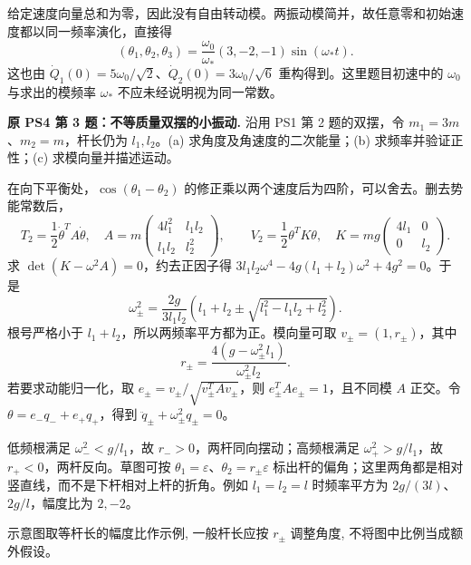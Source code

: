 \begin{solution}
给定速度向量总和为零，因此没有自由转动模。两振动模简并，故任意零和初始速度都以同一频率演化，直接得
\[
 (\theta_1,\theta_2,\theta_3)
 =\frac{\omega_0}{\omega_*}(3,-2,-1)\sin(\omega_*t).
\]
这也由 $\dot Q_1(0)=5\omega_0/\sqrt2$、$\dot Q_2(0)=3\omega_0/\sqrt6$ 重构得到。这里题目初速中的 $\omega_0$ 与求出的模频率 $\omega_*$ 不应未经说明视为同一常数。
\end{solution}

\begin{example}
\textbf{原 PS4 第 3 题：不等质量双摆的小振动.} 
沿用 PS1 第 2 题的双摆，令 $m_1=3m$、$m_2=m$，杆长仍为 $l_1,l_2$。(a) 求角度及角速度的二次能量；(b) 求频率并验证正性；(c) 求模向量并描述运动。
\end{example}
\begin{solution}
在向下平衡处，$\cos(\theta_1-\theta_2)$ 的修正乘以两个速度后为四阶，可以舍去。删去势能常数后，
\[
 T_2=\frac12\dot\theta^TA\dot\theta,\quad
 A=m\begin{pmatrix}4l_1^2&l_1l_2\\l_1l_2&l_2^2\end{pmatrix},\qquad
 V_2=\frac12\theta^TK\theta,\quad
 K=mg\begin{pmatrix}4l_1&0\\0&l_2\end{pmatrix}.
\]
求 $\det(K-\omega^2A)=0$，约去正因子得 $3l_1l_2\omega^4-4g(l_1+l_2)\omega^2+4g^2=0$。于是
\[
 \omega_\pm^2=\frac{2g}{3l_1l_2}
 \left(l_1+l_2\pm\sqrt{l_1^2-l_1l_2+l_2^2}\right).
\]
根号严格小于 $l_1+l_2$，所以两频率平方都为正。模向量可取 $v_\pm=(1,r_\pm)$，其中
\[
 r_\pm=\frac{4(g-\omega_\pm^2l_1)}{\omega_\pm^2l_2}.
\]
若要求动能归一化，取 $e_\pm=v_\pm/\sqrt{v_\pm^TAv_\pm}$，则 $e_\pm^TAe_\pm=1$，且不同模 $A$ 正交。令 $\theta=e_-q_-+e_+q_+$，得到 $\ddot q_\pm+\omega_\pm^2q_\pm=0$。

低频根满足 $\omega_-^2<g/l_1$，故 $r_->0$，两杆同向摆动；高频根满足 $\omega_+^2>g/l_1$，故 $r_+<0$，两杆反向。草图可按 $\theta_1=\varepsilon$、$\theta_2=r_\pm\varepsilon$ 标出杆的偏角；这里两角都是相对竖直线，而不是下杆相对上杆的折角。例如 $l_1=l_2=l$ 时频率平方为 $2g/(3l)$、$2g/l$，幅度比为 $2,-2$。
\begin{center}
\end{center}
示意图取等杆长的幅度比作示例, 一般杆长应按 $r_\pm$ 调整角度, 不将图中比例当成额外假设。


\end{solution}
